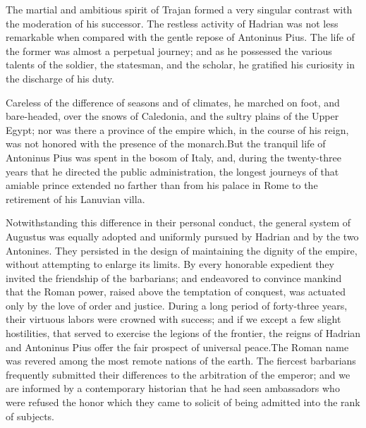 The martial and ambitious spirit of Trajan formed a very singular
contrast with the moderation of his successor. The restless
activity of Hadrian was not less remarkable when compared with
the gentle repose of Antoninus Pius. The life of the former was
almost a perpetual journey; and as he possessed the various
talents of the soldier, the statesman, and the scholar, he
gratified his curiosity in the discharge of his duty.

Careless of the difference of seasons and of climates, he marched
on foot, and bare-headed, over the snows of Caledonia, and the
sultry plains of the Upper Egypt; nor was there a province of the
empire which, in the course of his reign, was not honored with
the presence of the monarch.\footnotemark[25] But the tranquil life of
Antoninus Pius was spent in the bosom of Italy, and, during the
twenty-three years that he directed the public administration,
the longest journeys of that amiable prince extended no farther
than from his palace in Rome to the retirement of his Lanuvian
villa.\footnotemark[26]



Notwithstanding this difference in their personal conduct, the
general system of Augustus was equally adopted and uniformly
pursued by Hadrian and by the two Antonines. They persisted in
the design of maintaining the dignity of the empire, without
attempting to enlarge its limits. By every honorable expedient
they invited the friendship of the barbarians; and endeavored to
convince mankind that the Roman power, raised above the
temptation of conquest, was actuated only by the love of order
and justice. During a long period of forty-three years, their
virtuous labors were crowned with success; and if we except a few
slight hostilities, that served to exercise the legions of the
frontier, the reigns of Hadrian and Antoninus Pius offer the fair
prospect of universal peace.\footnotemark[27] The Roman name was revered among
the most remote nations of the earth. The fiercest barbarians
frequently submitted their differences to the arbitration of the
emperor; and we are informed by a contemporary historian that he
had seen ambassadors who were refused the honor which they came
to solicit of being admitted into the rank of subjects.\footnotemark[28]

